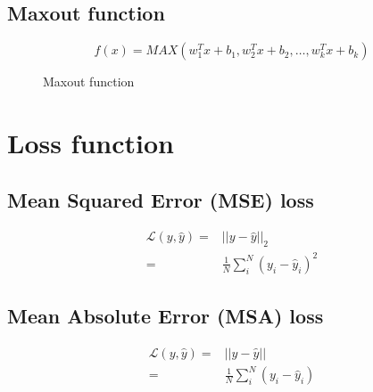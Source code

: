 \subsection{Maxout function}
\begin{equation}
    f(x) = MAX(w^{T}_{1}x + b_{1},w^{T}_{2}x + b_{2},\ldots,w^{T}_{k}x + b_{k})
\end{equation}

\begin{figure}[H]
    \centering
    \caption{Maxout function}
\end{figure}

\section{Loss function}
\subsection{Mean Squared Error (MSE) loss}
\begin{equation}
    \begin{aligned}
    \mathcal{L}(y,\hat{y}) =& || y - \hat{y} ||_{2}\\
                           =& \frac{1}{N}\sum^{N}_{i} (y_{i} - \hat{y}_{i})^{2} 
    \end{aligned}
\end{equation}
\subsection{Mean Absolute Error (MSA) loss}
\begin{equation}
    \begin{aligned}
    \mathcal{L}(y,\hat{y}) =& || y - \hat{y} ||\\
                           =& \frac{1}{N}\sum^{N}_{i} (y_{i} - \hat{y}_{i}) 
    \end{aligned}
\end{equation}
